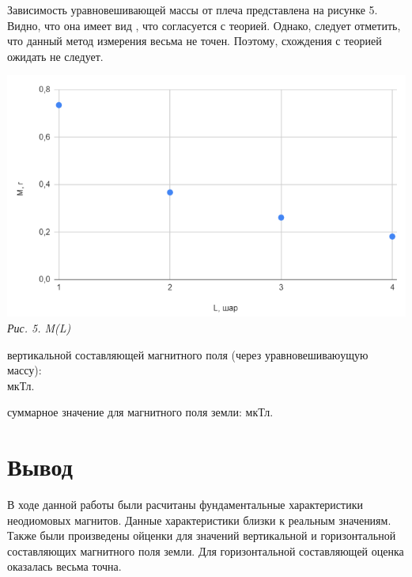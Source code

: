 Зависимость уравновешивающей массы от плеча представлена на рисунке 5. Видно, что она имеет вид , что согласуется с теорией. Однако, следует отметить, что данный метод измерения весьма не точен. Поэтому, схождения с теорией ожидать не следует.

\begin{center}

    \includegraphics[scale=0.9]{picks/121-graph2.png} \\
    \textit{Рис. 5. M(L)}

\end{center}

 вертикальной составляющей магнитного поля (через уравновешиваюущую массу):\\
 мкТл.

 суммарное значение для магнитного поля земли:  мкТл.

\section{Вывод}

В ходе данной работы были расчитаны фундаментальные характеристики неодиомовых магнитов. Данные характеристики близки к реальным значениям. Также были произведены ойценки для значений вертикальной и горизонтальной составляющих магнитного поля земли. Для горизонтальной составляющей оценка оказалась весьма точна.